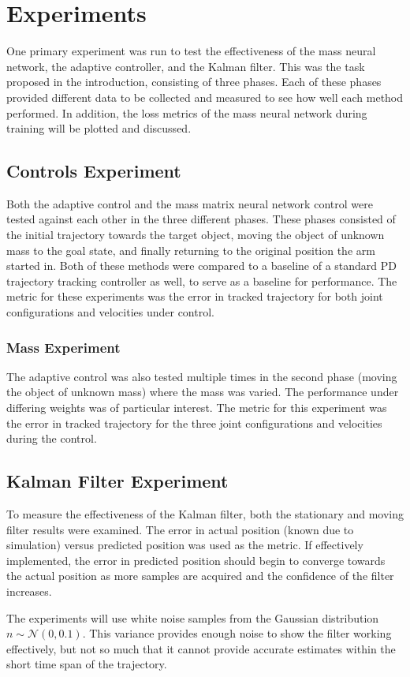 \section{Experiments}
One primary experiment was run to test the effectiveness of the mass neural network, the adaptive controller, and the Kalman filter.
This was the task proposed in the introduction, consisting of three phases.
Each of these phases provided different data to be collected and measured to see how well each method performed.
In addition, the loss metrics of the mass neural network during training will be plotted and discussed.

\subsection*{Controls Experiment}
Both the adaptive control and the mass matrix neural network control were tested against each other in the three different phases.
These phases consisted of the initial trajectory towards the target object, moving the object of unknown mass to the goal state, and finally returning to the original position the arm started in.
Both of these methods were compared to a baseline of a standard PD trajectory tracking controller as well, to serve as a baseline for performance.
The metric for these experiments was the error in tracked trajectory for both joint configurations and velocities under control.

\subsubsection*{Mass Experiment}
The adaptive control was also tested multiple times in the second phase (moving the object of unknown mass) where the mass was varied.
The performance under differing weights was of particular interest.
The metric for this experiment was the error in tracked trajectory for the three joint configurations and velocities during the control.

\subsection*{Kalman Filter Experiment}
To measure the effectiveness of the Kalman filter, both the stationary and moving filter results were examined.
The error in actual position (known due to simulation) versus predicted position was used as the metric.
If effectively implemented, the error in predicted position should begin to converge towards the actual position as more samples are acquired and the confidence of the filter increases.

The experiments will use white noise samples from the Gaussian distribution $n\sim \mathcal{N}(0,0.1)$.
This variance provides enough noise to show the filter working effectively, but not so much that it cannot provide accurate estimates within the short time span of the trajectory.



